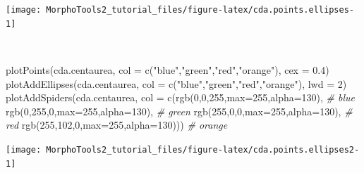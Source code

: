 \documentclass[
  11pt,
  a4paper]{article}
\newenvironment{Shaded}{\begin{snugshade}}{\end{snugshade}}
\newcommand{\AttributeTok}[1]{\textcolor[rgb]{0.77,0.63,0.00}{#1}}
\newcommand{\CommentTok}[1]{\textcolor[rgb]{0.56,0.35,0.01}{\textit{#1}}}
\newcommand{\DecValTok}[1]{\textcolor[rgb]{0.00,0.00,0.81}{#1}}
\newcommand{\FloatTok}[1]{\textcolor[rgb]{0.00,0.00,0.81}{#1}}
\newcommand{\FunctionTok}[1]{\textcolor[rgb]{0.00,0.00,0.00}{#1}}
\newcommand{\NormalTok}[1]{#1}
\newcommand{\StringTok}[1]{\textcolor[rgb]{0.31,0.60,0.02}{#1}}
\begin{document}
\begin{center}\texttt{[image: MorphoTools2\_tutorial\_files/figure-latex/cda.points.ellipses-1]} \end{center}

~\\
\hspace*{0.333em}

\begin{Shaded}
\begin{Highlighting}[]
\FunctionTok{plotPoints}\NormalTok{(cda.centaurea, }\AttributeTok{col =} \FunctionTok{c}\NormalTok{(}\StringTok{"blue"}\NormalTok{,}\StringTok{"green"}\NormalTok{,}\StringTok{"red"}\NormalTok{,}\StringTok{"orange"}\NormalTok{), }\AttributeTok{cex =} \FloatTok{0.4}\NormalTok{)}
\FunctionTok{plotAddEllipses}\NormalTok{(cda.centaurea, }\AttributeTok{col =} \FunctionTok{c}\NormalTok{(}\StringTok{"blue"}\NormalTok{,}\StringTok{"green"}\NormalTok{,}\StringTok{"red"}\NormalTok{,}\StringTok{"orange"}\NormalTok{), }\AttributeTok{lwd =} \DecValTok{2}\NormalTok{)}
\FunctionTok{plotAddSpiders}\NormalTok{(cda.centaurea, }\AttributeTok{col =} \FunctionTok{c}\NormalTok{(}\FunctionTok{rgb}\NormalTok{(}\DecValTok{0}\NormalTok{,}\DecValTok{0}\NormalTok{,}\DecValTok{255}\NormalTok{,}\AttributeTok{max=}\DecValTok{255}\NormalTok{,}\AttributeTok{alpha=}\DecValTok{130}\NormalTok{), }\CommentTok{\# blue}
                                      \FunctionTok{rgb}\NormalTok{(}\DecValTok{0}\NormalTok{,}\DecValTok{255}\NormalTok{,}\DecValTok{0}\NormalTok{,}\AttributeTok{max=}\DecValTok{255}\NormalTok{,}\AttributeTok{alpha=}\DecValTok{130}\NormalTok{), }\CommentTok{\# green}
                                      \FunctionTok{rgb}\NormalTok{(}\DecValTok{255}\NormalTok{,}\DecValTok{0}\NormalTok{,}\DecValTok{0}\NormalTok{,}\AttributeTok{max=}\DecValTok{255}\NormalTok{,}\AttributeTok{alpha=}\DecValTok{130}\NormalTok{), }\CommentTok{\# red}
                                      \FunctionTok{rgb}\NormalTok{(}\DecValTok{255}\NormalTok{,}\DecValTok{102}\NormalTok{,}\DecValTok{0}\NormalTok{,}\AttributeTok{max=}\DecValTok{255}\NormalTok{,}\AttributeTok{alpha=}\DecValTok{130}\NormalTok{))) }\CommentTok{\# orange}
\end{Highlighting}
\end{Shaded}

\begin{center}\texttt{[image: MorphoTools2\_tutorial\_files/figure-latex/cda.points.ellipses2-1]} \end{center}

\newpage
\end{document}
